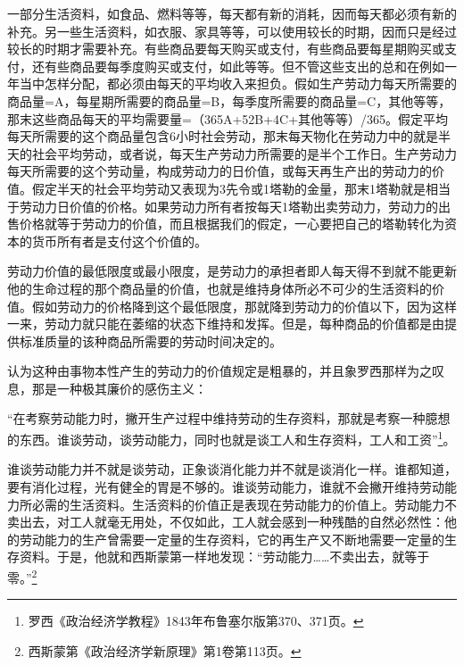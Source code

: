 \documentclass{ctexbook}
\begin{document}
    一部分生活资料，如食品、燃料等等，每天都有新的消耗，因而每天都必须有新的补充。另一些生活资料，如衣服、家具等等，可以使用较长的时期，因而只是经过较长的时期才需要补充。有些商品要每天购买或支付，有些商品要每星期购买或支付，还有些商品要每季度购买或支付，如此等等。但不管这些支出的总和在例如一年当中怎样分配，都必须由每天的平均收入来担负。假如生产劳动力每天所需要的商品量=A，每星期所需要的商品量=B，每季度所需要的商品量=C，其他等等，那末这些商品每天的平均需要量=（365A+52B+4C+其他等等）/365。假定平均每天所需要的这个商品量包含6小时社会劳动，那末每天物化在劳动力中的就是半天的社会平均劳动，或者说，每天生产劳动力所需要的是半个工作日。生产劳动力每天所需要的这个劳动量，构成劳动力的日价值，或每天再生产出的劳动力的价值。假定半天的社会平均劳动又表现为3先令或1塔勒的金量，那末1塔勒就是相当于劳动力日价值的价格。如果劳动力所有者按每天1塔勒出卖劳动力，劳动力的出售价格就等于劳动力的价值，而且根据我们的假定，一心要把自己的塔勒转化为资本的货币所有者是支付这个价值的。

    劳动力价值的最低限度或最小限度，是劳动力的承担者即人每天得不到就不能更新他的生命过程的那个商品量的价值，也就是维持身体所必不可少的生活资料的价值。假如劳动力的价格降到这个最低限度，那就降到劳动力的价值以下，因为这样一来，劳动力就只能在萎缩的状态下维持和发挥。但是，每种商品的价值都是由提供标准质量的该种商品所需要的劳动时间决定的。

    认为这种由事物本性产生的劳动力的价值规定是粗暴的，并且象罗西那样为之叹息，那是一种极其廉价的感伤主义：

    “在考察劳动能力时，撇开生产过程中维持劳动的生存资料，那就是考察一种臆想的东西。谁谈劳动，谈劳动能力，同时也就是谈工人和生存资料，工人和工资”\footnote{罗西《政治经济学教程》1843年布鲁塞尔版第370、371页。}。

    谁谈劳动能力并不就是谈劳动，正象谈消化能力并不就是谈消化一样。谁都知道，要有消化过程，光有健全的胃是不够的。谁谈劳动能力，谁就不会撇开维持劳动能力所必需的生活资料。生活资料的价值正是表现在劳动能力的价值上。劳动能力不卖出去，对工人就毫无用处，不仅如此，工人就会感到一种残酷的自然必然性：他的劳动能力的生产曾需要一定量的生存资料，它的再生产又不断地需要一定量的生存资料。于是，他就和西斯蒙第一样地发现：“劳动能力……不卖出去，就等于零。”\footnote{西斯蒙第《政治经济学新原理》第1卷第113页。}
\end{document}
